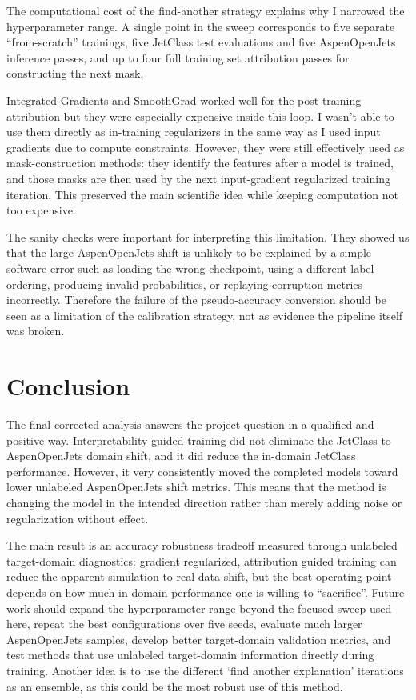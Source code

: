 \documentclass[11pt]{article}
\begin{document}
The computational cost of the find-another strategy explains why I narrowed the hyperparameter range. A single point in the sweep corresponds to five separate “from-scratch” trainings, five JetClass test evaluations and five AspenOpenJets inference passes, and up to four full training set attribution passes for constructing the next mask. 

Integrated Gradients and SmoothGrad worked well for the post-training attribution but they were especially expensive inside this loop. I wasn’t able to use them directly as in-training regularizers in the same way as I used input gradients due to compute constraints. However, they were still effectively used as mask-construction methods: they identify the features after a model is trained, and those masks are then used by the next input-gradient regularized training iteration. This preserved the main scientific idea while keeping computation not too expensive. 


The sanity checks were important for interpreting this limitation. They showed us that the large AspenOpenJets shift is unlikely to be explained by a simple software error such as loading the wrong checkpoint, using a different label ordering, producing invalid probabilities, or replaying corruption metrics incorrectly. Therefore the failure of the pseudo-accuracy conversion should be seen as a limitation of the calibration strategy, not as evidence the pipeline itself was broken.


\section{Conclusion}

The final corrected analysis answers the project question in a qualified and positive way. Interpretability guided training did not eliminate the JetClass to AspenOpenJets domain shift, and it did reduce the in-domain JetClass performance. However, it very consistently moved the completed models toward lower unlabeled AspenOpenJets shift metrics. This means that the method is changing the model in the intended direction rather than merely adding noise or regularization without effect.

The main result is an accuracy robustness tradeoff measured through unlabeled target-domain diagnostics: gradient regularized, attribution guided training can reduce the apparent simulation to real data shift, but the best operating point depends on how much in-domain performance one is willing to “sacrifice”.  Future work should expand the hyperparameter range beyond the focused sweep used here, repeat the best configurations over five seeds, evaluate much larger AspenOpenJets samples, develop better target-domain validation metrics, and test methods that use unlabeled target-domain information directly during training. Another idea is to use the different ‘find another explanation’ iterations as an ensemble, as this could be the most robust use of this method.



\end{document}
